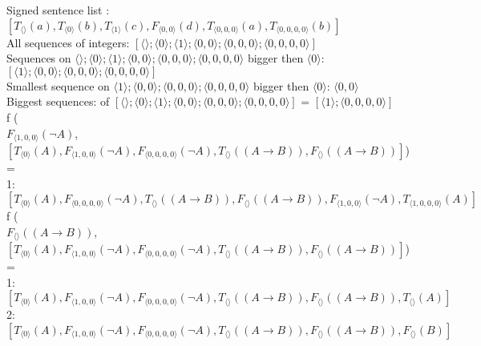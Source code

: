 \documentclass{article}
\begin{document}
\scriptsize{ Signed sentence list : $[T_{\langle  \rangle}(a), T_{\langle 0 \rangle}(b), T_{\langle 1 \rangle}(c), F_{\langle 0, 0 \rangle}(d), T_{\langle 0, 0, 0 \rangle}(a), T_{\langle 0, 0, 0, 0 \rangle}(b)]$
\\ All sequences of integers: $[\langle  \rangle; \langle 0 \rangle; \langle 1 \rangle; \langle 0, 0 \rangle; \langle 0, 0, 0 \rangle; \langle 0, 0, 0, 0 \rangle]$
\\ Sequences on $\langle  \rangle; \langle 0 \rangle; \langle 1 \rangle; \langle 0, 0 \rangle; \langle 0, 0, 0 \rangle; \langle 0, 0, 0, 0 \rangle$ bigger then $\langle 0 \rangle$: $[\langle 1 \rangle; \langle 0, 0 \rangle; \langle 0, 0, 0 \rangle; \langle 0, 0, 0, 0 \rangle]$
\\ Smallest sequence on $\langle 1 \rangle; \langle 0, 0 \rangle; \langle 0, 0, 0 \rangle; \langle 0, 0, 0, 0 \rangle$ bigger then $\langle 0 \rangle$: $\langle 0, 0 \rangle$
\\ Biggest sequences: of $[\langle  \rangle; \langle 0 \rangle; \langle 1 \rangle; \langle 0, 0 \rangle; \langle 0, 0, 0 \rangle; \langle 0, 0, 0, 0 \rangle]$ =  $[\langle 1 \rangle; \langle 0, 0, 0, 0 \rangle]$
\\f (
\\ $F_{\langle 1, 0, 0 \rangle}(\neg A)$, 
\\ $[T_{\langle 0 \rangle}(A), F_{\langle 1, 0, 0 \rangle}(\neg A), F_{\langle 0, 0, 0, 0 \rangle}(\neg A), T_{\langle  \rangle}((A \rightarrow B)), F_{\langle  \rangle}((A \rightarrow B))]$) 
= \\ 1: $[T_{\langle 0 \rangle}(A), F_{\langle 0, 0, 0, 0 \rangle}(\neg A), T_{\langle  \rangle}((A \rightarrow B)), F_{\langle  \rangle}((A \rightarrow B)), F_{\langle 1, 0, 0 \rangle}(\neg A), T_{\langle 1, 0, 0, 0 \rangle}(A)]$
\\f (
\\ $F_{\langle  \rangle}((A \rightarrow B))$, 
\\ $[T_{\langle 0 \rangle}(A), F_{\langle 1, 0, 0 \rangle}(\neg A), F_{\langle 0, 0, 0, 0 \rangle}(\neg A), T_{\langle  \rangle}((A \rightarrow B)), F_{\langle  \rangle}((A \rightarrow B))]$) 
= \\ 1: $[T_{\langle 0 \rangle}(A), F_{\langle 1, 0, 0 \rangle}(\neg A), F_{\langle 0, 0, 0, 0 \rangle}(\neg A), T_{\langle  \rangle}((A \rightarrow B)), F_{\langle  \rangle}((A \rightarrow B)), T_{\langle  \rangle}(A)]$
\\ 2: $[T_{\langle 0 \rangle}(A), F_{\langle 1, 0, 0 \rangle}(\neg A), F_{\langle 0, 0, 0, 0 \rangle}(\neg A), T_{\langle  \rangle}((A \rightarrow B)), F_{\langle  \rangle}((A \rightarrow B)), F_{\langle  \rangle}(B)]$
}
\end{document}
